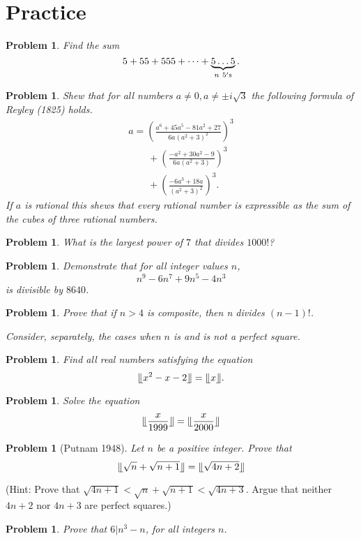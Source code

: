 \documentclass[11pt, openany]{book}
\theoremstyle{change} \theoremheaderfont{\blue\sffamily\bfseries}
\newtheorem{pro}[thm]{Problem}
\theoremstyle{nonumberplain} \theoremheaderfont{\sffamily\bfseries}
\newcommand{\í}{\'{\i}}
\begin{document}
\section*{Practice}\begin{multicols}{2}\columnseprule 1pt \columnsep 25pt
\begin{pro} Find the sum
$$5 + 55 + 555 + \cdots + \underbrace{5\ldots 5}_{n \ 5{\rm 's}}. $$\end{pro}
\begin{pro} Shew that for all numbers $a \neq 0, a \neq \pm i\sqrt{3}$
the following formula of Reyley (1825) holds.
$$\begin{array}{l}
a = \left(\frac{a^6 + 45a^5 - 81a^2 + 27}{6a(a^2 + 3)^2}\right)^3
\\ \qquad + \left(\frac{-a^2 + 30a^2 - 9}{6a(a^2 + 3)}\right)^3\\ \qquad  +
\left(\frac{-6a^3 + 18a}{(a^2 + 3)^2}\right) ^3. \end{array}
$$ If $a$ is rational this shews that
every rational number is expressible as the sum of the cubes of
three rational numbers.
\end{pro}
\begin{pro} What is the largest power of $7$ that divides $1000!$?\end{pro}
\begin{pro}Demonstrate that for all integer values $n$, $$ n^9 - 6n^7 + 9n^5 - 4n^3$$
is divisible by $8640$.\end{pro}
\begin{pro} Prove that if $n > 4$ is composite, then n divides $(n - 1)!$. \\
\begin{answer} Consider, separately, the cases when $n$ is and is not a
perfect square.\end{answer}
\end{pro}
\begin{pro}
Find all real numbers satisfying the equation
$$\llfloor x^2 - x - 2\rrfloor = \llfloor x\rrfloor.$$
\end{pro}
\begin{pro}
Solve the equation
$$\llfloor \frac{x}{1999}\rrfloor = \llfloor \frac{x}{2000}\rrfloor$$
\end{pro}
\begin{pro}[Putnam 1948]
Let $n$ be a positive integer. Prove that
$$\llfloor \sqrt{n} + \sqrt{n + 1} \rrfloor = \llfloor \sqrt{4n + 2} \rrfloor $$
\end{pro}
(Hint: Prove that $\sqrt{4n + 1} < \sqrt{n} + \sqrt{n + 1} <
\sqrt{4n + 3}$. Argue that neither $4n + 2$ nor $4n + 3$ are
perfect squares.)
\begin{pro} Prove that $6|n^3 - n$, for all integers $n$. \end{pro}


\end{multicols}
\end{document}

